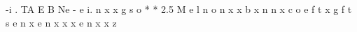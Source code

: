 \documentclass{article}%
\begin{document}
{-}i\newline%
.\newline%
TA\newline%
E\newline%
B\newline%
Ne\newline%
 {-}\newline%
e\newline%
i.\newline%
n\newline%
x\newline%
x\newline%
g\newline%
s\newline%
o\newline%
* * 2.5 M\newline%
e\newline%
l\newline%
n\newline%
o\newline%
n\newline%
x\newline%
x\newline%
b\newline%
x\newline%
n\newline%
n\newline%
x\newline%
c\newline%
o\newline%
e\newline%
f\newline%
t\newline%
x\newline%
g\newline%
f\newline%
t\newline%
s\newline%
e\newline%
n\newline%
x\newline%
e\newline%
n\newline%
x\newline%
x\newline%
x\newline%
e\newline%
n\newline%
x\newline%
x\newline%
z\newline%
\end{document}
